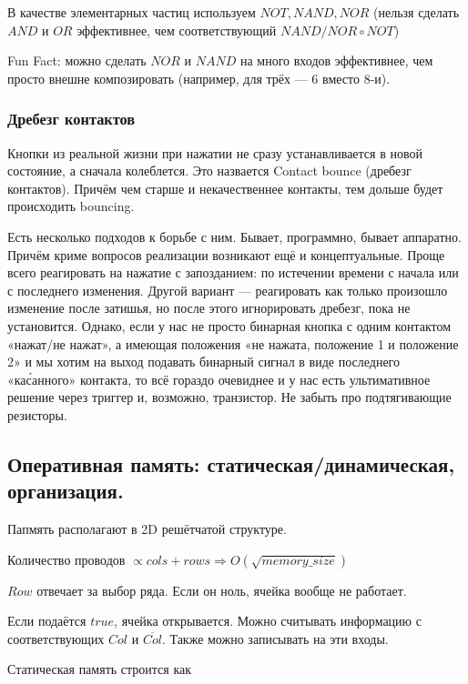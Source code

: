\documentclass[12pt, a4paper]{article}
\begin{document}
В качестве элементарных частиц используем $NOT, NAND, NOR$ (нельзя сделать $AND$ и $OR$ эффективнее, чем соответствующий $NAND/NOR \circ NOT$)

Fun Fact: можно сделать $NOR$ и $NAND$ на много входов эффективнее, чем просто внешне композировать (например, для трёх — 6 вместо 8-и).


\subsubsection{Дребезг контактов}

Кнопки из реальной жизни при нажатии не сразу устанавливается в новой состояние, а сначала колеблется. 
Это назвается Contact bounce (дребезг контактов). Причём чем старше и некачественнее контакты, тем дольше будет происходить bouncing.

Есть несколько подходов к борьбе с ним. Бывает, программно, бывает аппаратно.
Причём криме вопросов реализации возникают ещё и концептуальные. 
Проще всего реагировать на нажатие с запозданием: по истечении времени с начала или с последнего изменения.
Другой вариант — реагировать как только произошло изменение после затишья, но после этого игнорировать дребезг, пока не установится.
Однако, если у нас не просто бинарная кнопка с одним контактом «нажат/не нажат», 
а имеющая положения «не нажата, положение 1 и положение 2» и мы хотим на выход подавать бинарный сигнал в виде последнего «ка\'санного» контакта, 
то всё гораздо очевиднее и у нас есть ультимативное решение через триггер и, возможно, транзистор.
Не забыть про подтягивающие резисторы.




\subsection{Оперативная память: статическая/динамическая, организация.}

Папмять располагают в 2D решётчатой структуре.

Количество проводов $\propto cols + rows  \Rightarrow O(\sqrt{memory\_size})$

$Row$ отвечает за выбор ряда. Если он ноль, ячейка вообще не работает.

Если подаётся $true$, ячейка открывается. Можно считывать информацию с соответствующих $Col$ и $\overline{Col}$.
Также можно записывать на эти входы.


Статическая память строится как 
\end{document}
